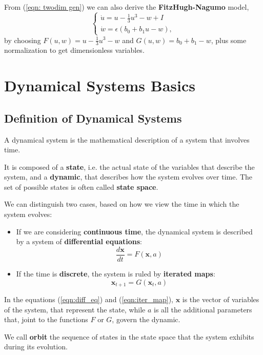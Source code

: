 \documentclass[oneside]{book}
\newcommand{\x}{\mathbf{x}}
\theoremstyle{definition}
\theoremstyle{plain}
\begin{document}
From (\ref{eqn: twodim gen}) we can also derive  the \textbf{FitzHugh-Nagumo }model,
\begin{equation}\label{eqn:fitzhugh}
    \begin{cases}
        \dot{u} = u -\frac{1}{3}u^3 -w+I\\
        \dot{w} = \epsilon(b_0 + b_1u -w),
    \end{cases}
\end{equation}
by choosing $F(u,w)=u-\frac{1}{3}u^3 -w$ and $G(u,w)=b_0 + b_1-w$, plus some normalization to get dimensionless variables.
\section{Dynamical Systems Basics}
\subsection{Definition of Dynamical Systems}
A dynamical system is the mathematical description of a system that involves time.

It is composed of a \textbf{state}, i.e. the actual state of the variables that describe the system, and a \textbf{dynamic}, that describes how the system evolves over time. The set of possible states is often called \textbf{state space}.

We can distinguish two cases, based on how we view the time in which the system evolves:
\begin{itemize}
    \item If we are considering \textbf{continuous time}, the dynamical system is described by a system of \textbf{differential equations}: 
    \begin{equation}\label{eqn:diff_eq}
        \frac{d\x}{dt} = F(\x, a)
    \end{equation}
    \item If the time is \textbf{discrete}, the system is ruled by \textbf{iterated maps}:
    \begin{equation}\label{eqn:iter_map}
        \x_{t+1} =G(\x_t, a)
    \end{equation}
\end{itemize}
In the equations (\ref{eqn:diff_eq}) and (\ref{eqn:iter_map}), $\x$ is the vector of variables of the system, that represent the state, while $a$ is all the additional parameters that, joint to the functions $F$ or $G$, govern the dynamic.

We call \textbf{orbit} the sequence of states in the state space that the system exhibits during its evolution. 
\end{document}
